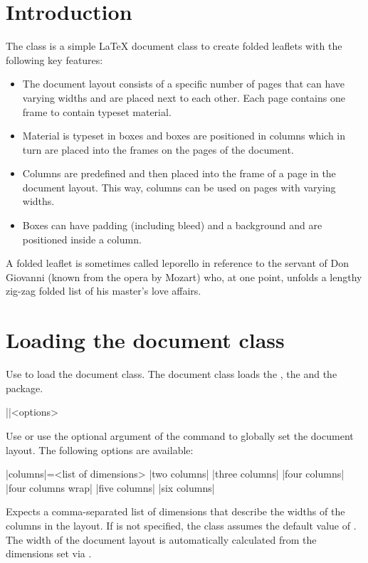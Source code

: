\documentclass[a4paper]{article}
\begin{document}
\printdoctitle
\bigskip

\section{Introduction}

The  class is a simple LaTeX document class to create folded leaflets with the following key features:

\begin{itemize}
  \item The document layout consists of a specific number of pages that can have varying widths and are placed next to each other. Each page contains one frame to contain typeset material.
  \item Material is typeset in boxes and boxes are positioned in columns which in turn are placed into the frames on the pages of the document.
  \item Columns are predefined and then placed into the frame of a page in the document layout. This way, columns can be used on pages with varying widths.
  \item Boxes can have padding (including bleed) and a background and are positioned inside a column.
\end{itemize}

A folded leaflet is sometimes called leporello in reference to the servant of Don Giovanni (known from the opera by Mozart) who, at one point, unfolds a lengthy zig-zag folded list of his master's love affairs.

\section{Loading the document class}

Use  to load the document class. The document class loads the , the  and the  package.

\begin{macrodef}
|\leporelloset|{<options>}
\end{macrodef}
Use \macro{\leporelloset} or use the optional argument of the \macro{\documentclass} command to globally set the document layout. The following options are available:

\begin{macrodef}
|columns|={<list of dimensions>}
|two columns|
|three columns|
|four columns|
|four columns wrap|
|five columns|
|six columns|
\end{macrodef}
Expects a comma-separated list of dimensions that describe the widths of the columns in the layout. If  is not specified, the class assumes the default value of \macro{97mm, 100mm, 100mm}. The width of the document layout is automatically calculated from the dimensions set via .
\end{document}

